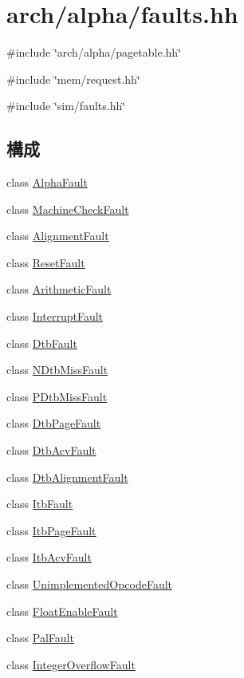 \hypertarget{arch_2alpha_2faults_8hh}{
\section{arch/alpha/faults.hh}
\label{arch_2alpha_2faults_8hh}
}
{\ttfamily \#include \char`\"{}arch/alpha/pagetable.hh\char`\"{}}\par
{\ttfamily \#include \char`\"{}mem/request.hh\char`\"{}}\par
{\ttfamily \#include \char`\"{}sim/faults.hh\char`\"{}}\par
\subsection*{構成}
\begin{DoxyCompactItemize}
\item 
class \hyperlink{classAlphaISA_1_1AlphaFault}{AlphaFault}
\item 
class \hyperlink{classAlphaISA_1_1MachineCheckFault}{MachineCheckFault}
\item 
class \hyperlink{classAlphaISA_1_1AlignmentFault}{AlignmentFault}
\item 
class \hyperlink{classAlphaISA_1_1ResetFault}{ResetFault}
\item 
class \hyperlink{classAlphaISA_1_1ArithmeticFault}{ArithmeticFault}
\item 
class \hyperlink{classAlphaISA_1_1InterruptFault}{InterruptFault}
\item 
class \hyperlink{classAlphaISA_1_1DtbFault}{DtbFault}
\item 
class \hyperlink{classAlphaISA_1_1NDtbMissFault}{NDtbMissFault}
\item 
class \hyperlink{classAlphaISA_1_1PDtbMissFault}{PDtbMissFault}
\item 
class \hyperlink{classAlphaISA_1_1DtbPageFault}{DtbPageFault}
\item 
class \hyperlink{classAlphaISA_1_1DtbAcvFault}{DtbAcvFault}
\item 
class \hyperlink{classAlphaISA_1_1DtbAlignmentFault}{DtbAlignmentFault}
\item 
class \hyperlink{classAlphaISA_1_1ItbFault}{ItbFault}
\item 
class \hyperlink{classAlphaISA_1_1ItbPageFault}{ItbPageFault}
\item 
class \hyperlink{classAlphaISA_1_1ItbAcvFault}{ItbAcvFault}
\item 
class \hyperlink{classAlphaISA_1_1UnimplementedOpcodeFault}{UnimplementedOpcodeFault}
\item 
class \hyperlink{classAlphaISA_1_1FloatEnableFault}{FloatEnableFault}
\item 
class \hyperlink{classAlphaISA_1_1PalFault}{PalFault}
\item 
class \hyperlink{classAlphaISA_1_1IntegerOverflowFault}{IntegerOverflowFault}
\end{DoxyCompactItemize}
